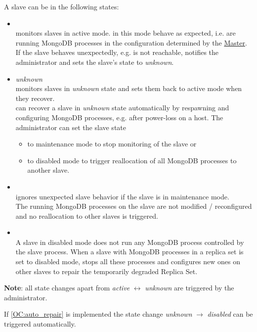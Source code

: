 \documentclass[a4paper, 11pt]{article}
\begin{document}
A slave can be in the following states:
\begin{itemize}
	\item {}\\
	\mamid monitors \glspl{slave} in active mode.  in this mode behave as expected, i.e. are running MongoDB processes in the configuration determined by the \hyperref[SM:Master]{Master}.\\
	If the slave behaves unexpectedly, e.g. is not reachable, \mamid notifies the \gls{administrator} and sets the slave's state to \emph{unknown}.
	\item \emph{unknown}\\
	\mamid monitors \glspl{slave} in \emph{unknown} state and sets them back to \gls{active mode} when they recover.\\
	\mamid can recover a slave in \emph{unknown} state automatically by respawning and configuring MongoDB processes, e.g. after power-loss on a  \gls{host}.
	The \gls{administrator} can set the slave state
	\begin{itemize}
		\item to \gls{maintenance mode} to stop monitoring of the slave or
		\item to \gls{disabled mode} to trigger reallocation of all \gls{MongoDB} processes to another slave.
	\end{itemize}
	\item {}\\
	\mamid ignores unexpected slave behavior if the slave is in maintenance mode.\\The running MongoDB processes on the slave are not modified / reconfigured and no reallocation to other slaves is triggered.
	\item {}\\
	A \gls{slave} in disabled mode does not run any \gls{MongoDB} process controlled by the slave process. When a \gls{slave} with MongoDB processes in a \gls{replica set} is set to disabled mode, \mamid stops all these processes and configures new ones on other \glspl{slave} to repair the temporarily degraded Replica Set.
\end{itemize}

\textbf{Note}: all state changes apart from \textit{active} $\leftrightarrow$ \textit{unknown} are triggered by the \gls{administrator}.

If \ref{OC:auto_repair} is implemented the state change \textit{unknown} $\rightarrow$ \textit{disabled} can be triggered automatically.
\end{document}
